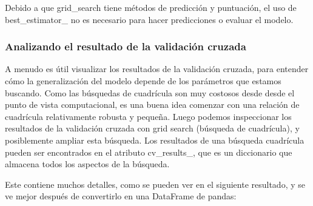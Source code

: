 Debido a que {\ttfamily grid\_search} tiene métodos de predicción y puntuación, el uso de {\ttfamily best\_estimator\_} no es necesario para hacer predicciones o evaluar el modelo.


\subsubsection{Analizando el resultado de la validación cruzada}


A menudo es útil visualizar los resultados de la validación cruzada,  para entender  cómo la  generalización del modelo depende de los parámetros que estamos buscando. Como las búsquedas de cuadrícula son muy costosos desde desde el punto de vista computacional, es una buena idea comenzar con una relación de cuadrícula relativamente robusta y pequeña.   %
Luego podemos inspeccionar los resultados de la validación cruzada con grid search
(búsqueda de cuadrícula), y posiblemente ampliar esta búsqueda. Los resultados de una búsqueda  cuadrícula  pueden ser encontrados en el atributo {\ttfamily cv\_results\_}, que es un diccionario que almacena todos los aspectos de la búsqueda. 

Este contiene muchos detalles, como se pueden ver en el siguiente resultado, y se ve mejor
después de convertirlo en una DataFrame de {\ttfamily pandas}:


